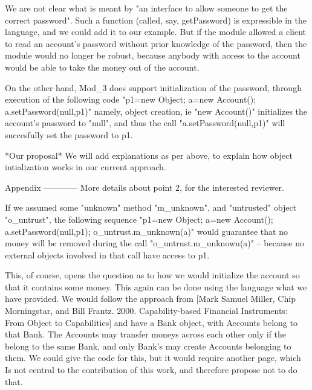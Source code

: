 We are not clear what is meant by "an interface to allow someone to get the 
correct password". Such a function (called, say, getPassword) is expressible
in the language, and we could add it to our example. But if the module allowed 
a client to read an account's password without prior knowledge of the password, 
then the module would no longer be robust, because anybody with access to
the account would be able to take the money out of the account. 

On the other hand, Mod_3 does support initialization of the password, through
execution of the following code
	"p1=new Object; a=new Account(); a.setPassword(null,p1)"
namely, object creation, ie "new Account()" initializes the account's password
to "null", and thus the call "a.setPassword(null,p1)" will succesfully set the password
to p1. 

*Our proposal* 
We will add explanations as per above, to explain how object intialization works 
in our current approach. 

Appendix
------------
More details about point 2, for the interested reviewer.

If we assumed some "unknown" method "m_unknown", and "untrusted" 
object "o_untrust", the following sequence
        "p1=new Object; a=new Account(); a.setPassword(null,p1); o_untrust.m_unknown(a)"
would guarantee that no money will be removed during the call "o_untrust.m_unknown(a)"
-- because no external objects involved in that call have access to p1.  

This, of course, opens the question as to how we would initialize the account 
so that it contains some money. This again can be done using the language what we have
provided. We would follow the approach from [Mark Samuel Miller, Chip Morningstar, and Bill 
Frantz. 2000. Capability-based Financial Instruments: From Object to Capabilities] and have a 
Bank object, with Accounts belong to that Bank. The Accounts may transfer moneys across 
each other only if the belong to the same Bank, and only Bank's may create Accounts 
belonging to them. We could give the code for this, but it would require another page, which
Is not central to the contribution of this work, and therefore propose not to do that.
	
 
